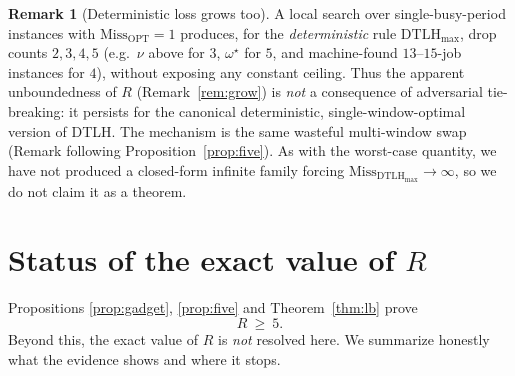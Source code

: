 \documentclass{amsart}
\theoremstyle{definition}
\newtheorem{remark}[theorem]{Remark}
\begin{document}
\begin{remark}[Deterministic loss grows too]\label{rem:detgrow}
A local search over single-busy-period instances with
$\mathrm{Miss}_{\mathrm{OPT}}=1$ produces, for the \emph{deterministic} rule
$\mathrm{DTLH}_{\max}$, drop counts $2,3,4,5$ (e.g.\ $\nu$ above for $3$,
$\omega^\star$ for $5$, and machine-found $13$--$15$-job instances for $4$),
without exposing any constant ceiling. Thus the apparent unboundedness of $R$
(Remark~\ref{rem:grow}) is \emph{not} a consequence of adversarial tie-breaking:
it persists for the canonical deterministic, single-window-optimal version of
DTLH. The mechanism is the same wasteful multi-window swap (Remark following
Proposition~\ref{prop:five}). As with the worst-case quantity, we have not
produced a closed-form infinite family forcing
$\mathrm{Miss}_{\mathrm{DTLH}_{\max}}\to\infty$, so we do not claim it as a
theorem.
\end{remark}

\section{Status of the exact value of $R$}

Propositions \ref{prop:gadget}, \ref{prop:five} and Theorem~\ref{thm:lb} prove
\[
R\ \ge\ 5 .
\]
Beyond this, the exact value of $R$ is \emph{not} resolved here. We summarize
honestly what the evidence shows and where it stops.
\end{document}
